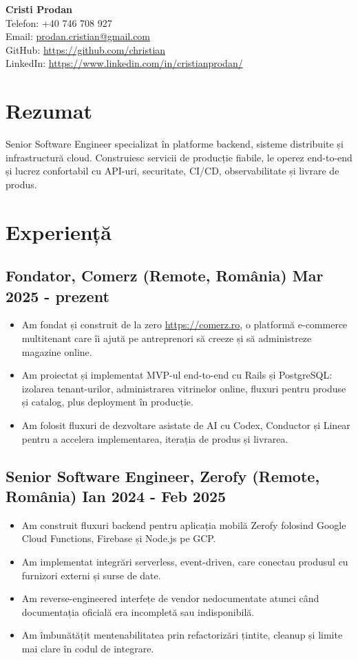 \documentclass[11pt,a4paper]{article}
\begin{document}
{\LARGE \textbf{Cristi Prodan}}\\
Telefon: +40 746 708 927 \\
Email: \href{mailto:prodan.cristian@gmail.com}{prodan.cristian@gmail.com} \\
GitHub: \href{https://github.com/christian}{https://github.com/christian} \\
LinkedIn: \href{https://www.linkedin.com/in/cristianprodan/}{https://www.linkedin.com/in/cristianprodan/} \\

\section*{Rezumat}
Senior Software Engineer specializat în platforme backend, sisteme distribuite și infrastructură cloud. Construiesc servicii de producție fiabile, le operez end-to-end și lucrez confortabil cu API-uri, securitate, CI/CD, observabilitate și livrare de produs.

\section*{Experiență}
\subsection*{Fondator, Comerz (Remote, România) \hfill Mar 2025 - prezent}
\begin{itemize}
  \item Am fondat și construit de la zero \href{https://comerz.ro}{https://comerz.ro}, o platformă e-commerce multitenant care îi ajută pe antreprenori să creeze și să administreze magazine online.
  \item Am proiectat și implementat MVP-ul end-to-end cu Rails și PostgreSQL: izolarea tenant-urilor, administrarea vitrinelor online, fluxuri pentru produse și catalog, plus deployment în producție.
  \item Am folosit fluxuri de dezvoltare asistate de AI cu Codex, Conductor și Linear pentru a accelera implementarea, iterația de produs și livrarea.
\end{itemize}

\subsection*{Senior Software Engineer, Zerofy (Remote, România) \hfill Ian 2024 - Feb 2025}
\begin{itemize}
  \item Am construit fluxuri backend pentru aplicația mobilă Zerofy folosind Google Cloud Functions, Firebase și Node.js pe GCP.
  \item Am implementat integrări serverless, event-driven, care conectau produsul cu furnizori externi și surse de date.
  \item Am reverse-engineered interfețe de vendor nedocumentate atunci când documentația oficială era incompletă sau indisponibilă.
  \item Am îmbunătățit mentenabilitatea prin refactorizări țintite, cleanup și limite mai clare în codul de integrare.
\end{itemize}
\end{document}
